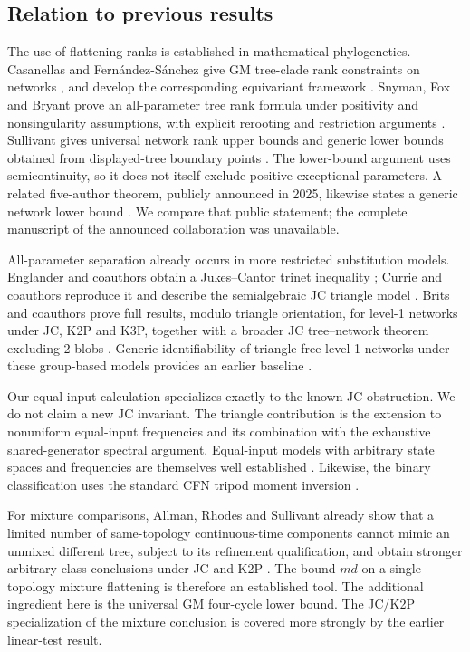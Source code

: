 \documentclass[11pt]{article}
\theoremstyle{definition}
\theoremstyle{remark}
\begin{document}
\subsection{Relation to previous results}

The use of flattening ranks is established in mathematical phylogenetics.
Casanellas and Fern\'andez-S\'anchez give GM tree-clade rank constraints on
networks \cite{CFS2021}, and develop the corresponding equivariant framework
\cite{CFS2025}. Snyman, Fox and Bryant prove an all-parameter tree rank
formula under positivity and nonsingularity assumptions, with explicit
rerooting and restriction arguments \cite{Snyman2023}. Sullivant gives
universal network rank upper bounds and generic lower bounds obtained from
displayed-tree boundary points \cite[Theorems 7.8 and 7.11]{Sullivant2026}.
The lower-bound argument uses semicontinuity, so it does not itself exclude
positive exceptional parameters. A related five-author theorem, publicly
announced in 2025, likewise states a generic network lower bound
\cite[slide 23]{SullivantIMSI2025}. We compare that public statement; the
complete manuscript of the announced collaboration was unavailable.

All-parameter separation already occurs in more restricted substitution
models. Englander and coauthors obtain a Jukes--Cantor trinet inequality
\cite[Proposition 2.26]{Englander2025}; Currie and coauthors reproduce it
and describe the semialgebraic JC triangle model
\cite[Theorem 3.1 and Appendix A]{Currie2026}. Brits and coauthors prove
full results, modulo triangle orientation, for level-1 networks under JC,
K2P and K3P, together with a broader JC tree--network theorem excluding
2-blobs \cite{Brits2026}. Generic identifiability
of triangle-free level-1 networks under these group-based models provides
an earlier baseline \cite[Theorem 2]{Gross2021}.

Our equal-input calculation specializes exactly to the known JC
obstruction. We do not claim a new JC invariant. The triangle contribution
is the extension to nonuniform equal-input frequencies and its combination
with the exhaustive shared-generator spectral argument. Equal-input models
with arbitrary state spaces and frequencies are themselves well established
\cite{CasanellasSteel2017}. Likewise, the binary classification uses the
standard CFN tripod moment inversion \cite{Hill2024}.

For mixture comparisons, Allman, Rhodes and Sullivant already show that a
limited number of same-topology continuous-time components cannot mimic an
unmixed different tree, subject to its refinement qualification, and obtain
stronger arbitrary-class conclusions
under JC and K2P \cite[Theorems 1 and 3]{ARS2012}. The bound $md$ on a
single-topology mixture flattening is therefore an established tool. The
additional ingredient here is the universal GM four-cycle lower bound.
The JC/K2P specialization of the mixture conclusion is covered more
strongly by the earlier linear-test result.
\end{document}
